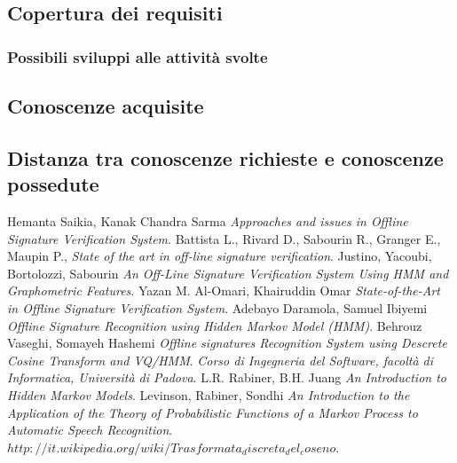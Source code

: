 \subsection{Copertura dei requisiti}
\label{4.1}

\subsubsection{Possibili sviluppi alle attività svolte}
\subsection{Conoscenze acquisite}

\label{4.2}
\subsection{Distanza tra conoscenze richieste e conoscenze possedute}

\label{4.3}
\newpage

\printglossaries
{}
\label{5.0}

\newpage
\begin{thebibliography}{1}
 Hemanta Saikia, Kanak Chandra Sarma {\em Approaches and issues in Offline Signature Verification System}.
 Battista L., Rivard D., Sabourin R., Granger E., Maupin P., {\em State of the art in off-line signature verification}.
 Justino, Yacoubi, Bortolozzi, Sabourin {\em An Off-Line Signature Verification System Using HMM and Graphometric Features}.
 Yazan M. Al-Omari, Khairuddin Omar {\em State-of-the-Art in Offline Signature Verification System}.
 Adebayo Daramola, Samuel Ibiyemi {\em Offline Signature Recognition using Hidden Markov Model (HMM)}.
 Behrouz Vaseghi, Somayeh Hashemi {\em Offline signatures Recognition System using Descrete Cosine Transform and VQ/HMM}.
 {\em Corso di Ingegneria del Software, facoltà di Informatica, Università di Padova}.
 L.R. Rabiner, B.H. Juang {\em An Introduction to Hidden Markov Models}.
 Levinson, Rabiner, Sondhi {\em An Introduction to the Application of the Theory of Probabilistic Functions of a Markov Process to Automatic Speech Recognition}.
 {\em $http://it.wikipedia.org/wiki/Trasformata_discreta_del_coseno$}.
\end{thebibliography}
\label{6.0}

\newpage






